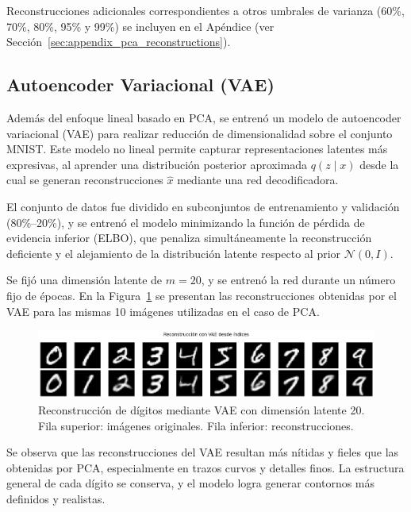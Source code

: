 \documentclass[11pt]{article}
\begin{document}
Reconstrucciones adicionales correspondientes a otros umbrales de varianza (60\%, 70\%, 80\%, 95\% y 99\%) se incluyen en el Apéndice (ver Sección~\ref{sec:appendix_pca_reconstructions}).


\subsection*{Autoencoder Variacional (VAE)}

Además del enfoque lineal basado en PCA, se entrenó un modelo de autoencoder variacional (VAE) para realizar reducción de dimensionalidad sobre el conjunto MNIST. Este modelo no lineal permite capturar representaciones latentes más expresivas, al aprender una distribución posterior aproximada $q(z \mid x)$ desde la cual se generan reconstrucciones $\hat{x}$ mediante una red decodificadora.

El conjunto de datos fue dividido en subconjuntos de entrenamiento y validación (80\%–20\%), y se entrenó el modelo minimizando la función de pérdida de evidencia inferior (ELBO), que penaliza simultáneamente la reconstrucción deficiente y el alejamiento de la distribución latente respecto al prior $\mathcal{N}(0, I)$.

Se fijó una dimensión latente de $m = 20$, y se entrenó la red durante un número fijo de épocas. En la Figura~\ref{fig:vae_reconstructed_images} se presentan las reconstrucciones obtenidas por el VAE para las mismas 10 imágenes utilizadas en el caso de PCA.

\begin{figure}[H]
    \centering
    \includegraphics[width=\textwidth]{figures/vae_reconstructions.png}
    \caption{Reconstrucción de dígitos mediante VAE con dimensión latente 20. Fila superior: imágenes originales. Fila inferior: reconstrucciones.}
    \label{fig:vae_reconstructed_images}
\end{figure}

Se observa que las reconstrucciones del VAE resultan más nítidas y fieles que las obtenidas por PCA, especialmente en trazos curvos y detalles finos. La estructura general de cada dígito se conserva, y el modelo logra generar contornos más definidos y realistas.
\end{document}
